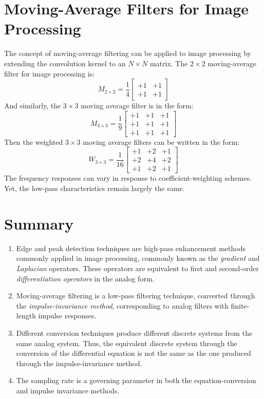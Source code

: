 \documentclass{article}
\begin{document}
\section{Moving-Average Filters for Image Processing}
The concept of moving-average filtering can be applied to image processing by extending the convolution kernel to an \(N\times N\) matrix. The \(2\times2\) moving-average filter for image processing is:
\[
M_{2\times2}=\frac{1}{4}
\begin{bmatrix}
+1&+1\\
+1&+1
\end{bmatrix}
\]
And similarly, the \(3\times3\) moving average filter is in the form:
\[
M_{3\times3}=\frac{1}{9}
\begin{bmatrix}
+1&+1&+1\\
+1&+1&+1\\
+1&+1&+1
\end{bmatrix}
\]
Then the weighted \(3\times3\) moving average filters can be written in the form:
\[
W_{3\times3}=\frac{1}{16}
\begin{bmatrix}
+1&+2&+1\\
+2&+4&+2\\
+1&+2&+1
\end{bmatrix}
\]
The frequency responses can vary in response to coefficient-weighting schemes. Yet, the low-pass characteristics remain largely the same.
\newpage
\section{Summary}
\begin{enumerate}
    \item Edge and peak detection techniques are high-pass enhancement methods commonly applied in image processing, commonly known as the \textit{gradient} and \textit{Laplacian} operators. These operators are equivalent to first and second-order \textit{differentiation operators} in the analog form.
    \item Moving-average filtering is a low-pass filtering technique, converted through the \textit{impulse-invariance method}, corresponding to analog filters with finite-length impulse responses.
    \item Different conversion techniques produce different discrete systems from the same analog system. Thus, the equivalent discrete system through the conversion of the differential equation is not the same as the one produced through the impulse-invariance method.
    \item The sampling rate is a governing parameter in both the equation-conversion and impulse invariance methods.
\end{enumerate}
\end{document}
